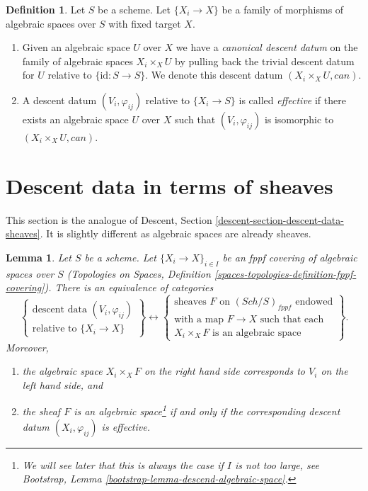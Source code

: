 \documentclass{stacks-project}
\theoremstyle{plain}
\newtheorem{lemma}[subsection]{Lemma}
\theoremstyle{definition}
\newtheorem{definition}[subsection]{Definition}
\theoremstyle{remark}
\numberwithin{equation}{subsection}
\def\Sch{\mathit{Sch}}
\begin{document}
\begin{definition}
\label{definition-effective-family}
Let $S$ be a scheme.
Let $\{X_i \to X\}$ be a family of morphisms of algebraic spaces over $S$
with fixed target $X$.
\begin{enumerate}
\item  Given an algebraic space $U$ over $X$
we have a {\it canonical descent datum} on the family of
algebraic spaces $X_i \times_X U$ by pulling back the trivial
descent datum for $U$ relative to $\{\text{id} : S \to S\}$.
We denote this descent datum $(X_i \times_X U, can)$.
\item A descent datum $(V_i, \varphi_{ij})$
relative to $\{X_i \to S\}$ is called {\it effective}
if there exists an algebraic space $U$ over $X$ such that
$(V_i, \varphi_{ij})$ is isomorphic to $(X_i \times_X U, can)$.
\end{enumerate}
\end{definition}






\section{Descent data in terms of sheaves}
\label{section-descent-data-sheaves}

\noindent
This section is the analogue of Descent, Section
\ref{descent-section-descent-data-sheaves}.
It is slightly different as algebraic spaces are already sheaves.

\begin{lemma}
\label{lemma-descent-data-sheaves}
Let $S$ be a scheme. Let $\{X_i \to X\}_{i \in I}$ be an fppf
covering of algebraic spaces over $S$ (Topologies on Spaces,
Definition \ref{spaces-topologies-definition-fppf-covering}).
There is an equivalence of categories
$$
\left\{
\begin{matrix}
\text{descent data }(V_i, \varphi_{ij})\\
\text{relative to }\{X_i \to X\}
\end{matrix}
\right\}
\leftrightarrow
\left\{
\begin{matrix}
\text{sheaves }F\text{ on }(\Sch/S)_{fppf}\text{ endowed}\\
\text{with a map }F \to X\text{ such that each}\\
X_i \times_X F\text{ is an algebraic space}
\end{matrix}
\right\}.
$$
Moreover,
\begin{enumerate}
\item the algebraic space $X_i \times_X F$ on the right hand side
corresponds to $V_i$ on the left hand side, and
\item the sheaf $F$ is an algebraic space\footnote{We will see
later that this is always the case if $I$ is not too large, see
Bootstrap, Lemma \ref{bootstrap-lemma-descend-algebraic-space}.}
if and only if the
corresponding descent datum $(X_i, \varphi_{ij})$ is effective.
\end{enumerate}
\end{lemma}
\end{document}
